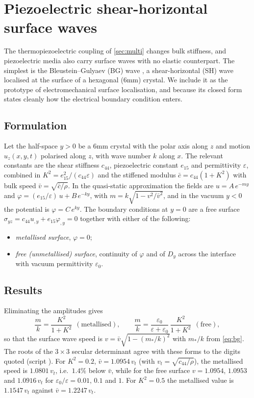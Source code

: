 \section{Piezoelectric shear-horizontal surface waves}\label{sec:bg}

The thermopiezoelectric coupling of \cref{sec:multi} changes bulk stiffness, and piezoelectric media also carry surface waves with no elastic counterpart. The simplest is the Bleustein--Gulyaev (BG) wave \citep{Bleustein1968,Gulyaev1969}, a shear-horizontal (SH) wave localised at the surface of a hexagonal (6mm) crystal. We include it as the prototype of electromechanical surface localisation, and because its closed form states cleanly how the electrical boundary condition enters.

\subsection{Formulation}
Let the half-space $y>0$ be a 6mm crystal with the polar axis along $z$ and motion $u_z(x,y,t)$ polarised along $z$, with wave number $k$ along $x$. The relevant constants are the shear stiffness $c_{44}$, piezoelectric constant $e_{15}$ and permittivity $\varepsilon$, combined in $K^2=e_{15}^2/(c_{44}\varepsilon)$ and the stiffened modulus $\bar c=c_{44}(1+K^2)$ with bulk speed $\bar v=\sqrt{\bar c/\rho}$. In the quasi-static approximation the fields are $u=A\,e^{-m y}$ and $\varphi=(e_{15}/\varepsilon)\,u+B\,e^{-ky}$, with $m=k\sqrt{1-v^2/\bar v^2}$, and in the vacuum $y<0$ the potential is $\varphi=C\,e^{ky}$. The boundary conditions at $y=0$ are a free surface $\sigma_{yz}=c_{44}u_{,y}+e_{15}\varphi_{,y}=0$ together with either of the following:
\begin{itemize}
\item \emph{metallised surface}, $\varphi=0$;
\item \emph{free (unmetallised) surface}, continuity of $\varphi$ and of $D_y$ across the interface with vacuum permittivity $\varepsilon_0$.
\end{itemize}

\subsection{Results}
Eliminating the amplitudes gives
\begin{equation}\label{eq:bg}
\frac{m}{k}=\frac{K^2}{1+K^2}\ \ (\text{metallised}),\qquad
\frac{m}{k}=\frac{\varepsilon_0}{\varepsilon+\varepsilon_0}\,\frac{K^2}{1+K^2}\ \ (\text{free}),
\end{equation}
so that the surface wave speed is $v=\bar v\sqrt{1-(m_\ast/k)^2}$ with $m_\ast/k$ from \cref{eq:bg}. The roots of the $3\times3$ secular determinant agree with these forms to the digits quoted (script ). For $K^2=0.2$, $\bar v=1.0954\,v_t$ (with $v_t=\sqrt{c_{44}/\rho}$), the metallised speed is $1.0801\,v_t$, i.e.\ $1.4\%$ below $\bar v$, while for the free surface $v=1.0954$, $1.0953$ and $1.0916\,v_t$ for $\varepsilon_0/\varepsilon=0.01,\,0.1$ and $1$. For $K^2=0.5$ the metallised value is $1.1547\,v_t$ against $\bar v=1.2247\,v_t$.

